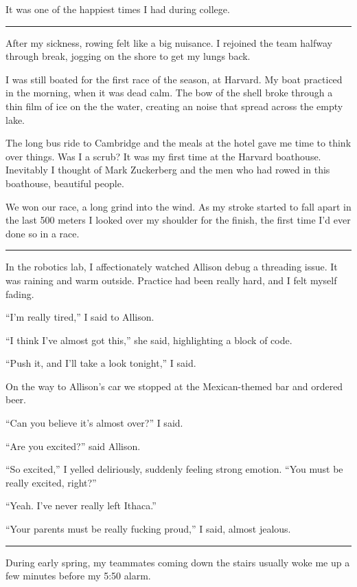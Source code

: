 It was one of the happiest times I had during college.

\plainfancybreak{12pt}{2}{* * *}

After my sickness, rowing felt like a big nuisance.  I rejoined the team halfway
through break, jogging on the shore to get my lungs back.  

I was still boated for the first race of the season, at Harvard.  My boat
practiced in the morning, when it was dead calm.  The bow of the shell broke
through a thin film of ice on the the water, creating an noise that spread
across the empty lake.   
 
The long bus ride to Cambridge and the meals at the hotel gave me time to think
over things.  Was I a scrub?  It was my first time at the Harvard boathouse.
Inevitably I thought of Mark Zuckerberg and the men who had rowed in this
boathouse, beautiful people. 

We won our race, a long grind into the wind. As my stroke started to fall apart
in the last 500 meters I looked over my shoulder for the finish, the first time
I'd ever done so in a race.

\plainfancybreak{12pt}{2}{* * *}

In the robotics lab, I affectionately watched Allison debug a threading issue.
It was raining and warm outside.  Practice had been really hard, and I felt
myself fading.

``I'm really tired,'' I said to Allison.

``I think I've almost got this,'' she said, highlighting a block of code.

``Push it, and I'll take a look tonight,'' I said.

On the way to Allison's car we stopped at the Mexican-themed bar and ordered
beer.

``Can you believe it's almost over?'' I said.

``Are you excited?'' said Allison.

``So excited,'' I yelled deliriously, suddenly feeling strong emotion.  ``You
must be really excited, right?''

``Yeah.  I've never really left Ithaca.''

``Your parents must be really fucking proud,'' I said, almost jealous.

\plainfancybreak{12pt}{2}{* * *}

During early spring, my teammates coming down the stairs usually woke me up a
few minutes before my 5:50 alarm.  

